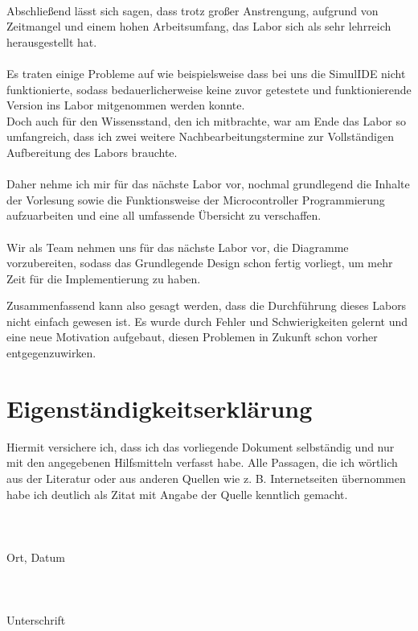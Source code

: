 \documentclass{article}
\begin{document}
\\
Abschließend lässt sich sagen, dass trotz großer Anstrengung, aufgrund von Zeitmangel und einem hohen Arbeitsumfang, das Labor sich als sehr lehrreich herausgestellt hat. 
\\
\\
Es traten einige Probleme auf wie beispielsweise dass bei uns die SimulIDE nicht funktionierte, sodass bedauerlicherweise keine zuvor getestete und funktionierende Version ins Labor mitgenommen werden konnte.
\\
Doch auch für den Wissensstand, den ich mitbrachte, war am Ende das Labor so umfangreich, dass ich zwei weitere Nachbearbeitungstermine zur Vollständigen Aufbereitung des Labors brauchte.   
\\
\\
Daher nehme ich mir für das nächste Labor vor, nochmal grundlegend die Inhalte der Vorlesung sowie die Funktionsweise der Microcontroller Programmierung aufzuarbeiten und eine all umfassende Übersicht zu verschaffen.  
\\
\\
Wir als Team nehmen uns für das nächste Labor vor, die Diagramme vorzubereiten, sodass das Grundlegende Design schon fertig vorliegt, um mehr Zeit für die Implementierung zu haben.

Zusammenfassend kann also gesagt werden, dass die Durchführung dieses Labors nicht einfach gewesen ist. Es wurde durch Fehler und Schwierigkeiten gelernt und eine neue Motivation aufgebaut, diesen Problemen in Zukunft schon vorher entgegenzuwirken.




\section*{Eigenständigkeitserklärung}

\noindent Hiermit versichere ich, dass ich das vorliegende Dokument selbständig und nur mit den angegebenen Hilfsmitteln verfasst habe. Alle Passagen, die ich wörtlich aus der Literatur oder aus anderen Quellen wie z. B. Internetseiten übernommen habe ich deutlich als Zitat mit Angabe der Quelle kenntlich gemacht. 
\\
\\
\\
\\
Ort, Datum
\\
\\
\\
\\
Unterschrift
\end{document}
